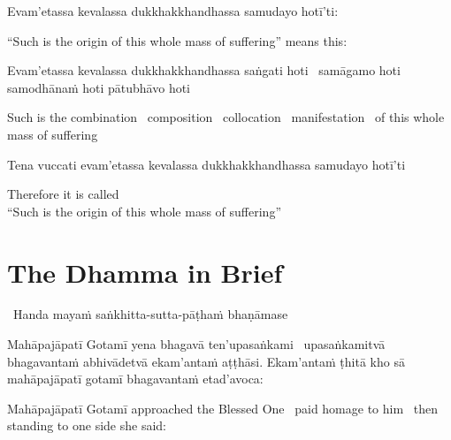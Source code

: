Evam'etassa kevalassa dukkhakkhandhassa samudayo hotī'ti:

\begin{english}
  ``Such is the origin of this whole mass of suffering'' means this:
\end{english}

\begin{pali-hang}
  Evam'etassa kevalassa dukkhakkhandhassa saṅgati hoti \breathmark\ samāgamo hoti samodhānaṁ hoti pātubhāvo hoti
\end{pali-hang}

\begin{english-hang}
  Such is the combination \breathmark\ composition \breathmark\ collocation \breathmark\ manifestation \breathmark\ of this whole mass of suffering
\end{english-hang}

\begin{pali-hang}
  Tena vuccati evam'etassa kevalassa dukkhakkhandhassa samudayo hotī'ti
\end{pali-hang}

\begin{english}
  Therefore it is called\\
  ``Such is the origin of this whole mass of suffering''
\end{english}

\suttaRef{[Vibh 130 / SN 12.2]}


\section{The Dhamma in Brief}
\label{dhamma-in-brief}

\begin{leader}
  \anglebracketleft\ \hspace{-0.5mm}Handa mayaṁ saṅkhitta-sutta-pāṭhaṁ bhaṇāmase \hspace{-0.5mm}\anglebracketright\
\end{leader}

\begin{pali-hang}
  Mahāpajāpatī Gotamī yena bhagavā ten'upasaṅkami \breathmark\ upasaṅkamitvā bhagavantaṁ abhivādetvā ekam'antaṁ aṭṭhāsi. Ekam'antaṁ ṭhitā kho sā mahāpajāpatī gotamī bhagavantaṁ etad'avoca:
\end{pali-hang}

\begin{english-hang}
  Mahāpajāpatī Gotamī approached the Blessed One \breathmark\ paid homage to him \breathmark\ then standing to one side she said:
\end{english-hang}

